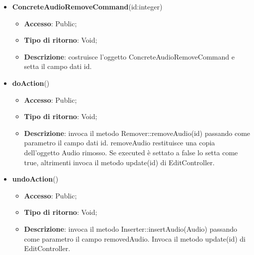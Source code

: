 {{{	
	\begin{itemize}
		\item \textbf{ConcreteAudioRemoveCommand}(id:integer)
		\begin{itemize}
			\item \textbf{Accesso}: Public;
			\item \textbf{Tipo di ritorno}: Void;
			\item \textbf{Descrizione}: costruisce l’oggetto ConcreteAudioRemoveCommand e setta il campo dati id.
		\end{itemize}
		\item \textbf{doAction}()
		\begin{itemize}
			\item \textbf{Accesso}: Public;
			\item \textbf{Tipo di ritorno}: Void;
			\item \textbf{Descrizione}: invoca il metodo Remover::removeAudio(id) passando come parametro il campo dati id. removeAudio restituisce una copia dell’oggetto Audio rimosso. Se executed è settato a false lo setta come true, altrimenti invoca il metodo update(id) di EditController.
		\end{itemize}
		\item \textbf{undoAction}()
		\begin{itemize}
			\item \textbf{Accesso}: Public;
			\item \textbf{Tipo di ritorno}: Void;
			\item \textbf{Descrizione}: invoca il metodo Inserter::insertAudio(Audio) passando come parametro il campo removedAudio. Invoca il metodo update(id) di EditController.
		\end{itemize}
	\end{itemize}
	}
}}
